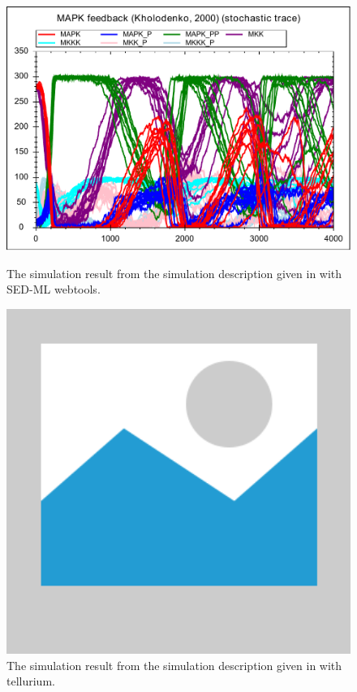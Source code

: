 \begin{figure}[ht]
    \centering
    \begin{minipage}{0.47\textwidth}
        \centering
        \includegraphics[width=1.0\textwidth]{examples/repeated-stochastic-runs/results/repeated-stochastic-runs}
        \caption{The simulation result from the simulation description given in  with SED-ML webtools.}
    \end{minipage}\hfill
    \begin{minipage}{0.47\textwidth}
        \centering
        \includegraphics[width=1.0\textwidth]{examples/placeholder}
        \caption{The simulation result from the simulation description given in  with tellurium.}
    \end{minipage}
    \label{fig:repeated-stochastic-runs}
\end{figure}

